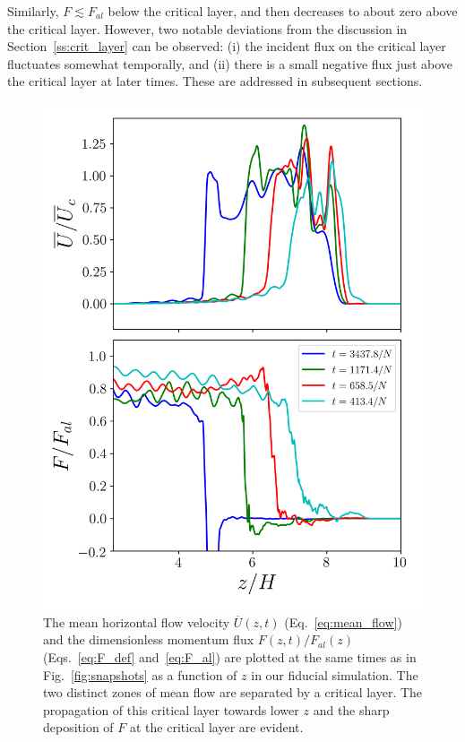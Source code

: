 \documentclass[
        fleqn,
        usenatbib,
        referee,
    ]{mnras}
\begin{document}
Similarly, $F \lesssim F_{al}$ below the critical layer, and then decreases to
about zero above the critical layer. However, two notable deviations from the
discussion in Section~\ref{ss:crit_layer} can be observed: (i) the incident flux
on the critical layer fluctuates somewhat temporally, and (ii) there is a small
negative flux just above the critical layer at later times. These are addressed
in subsequent sections.
\begin{figure}
    \centering
    \includegraphics[width=0.9\columnwidth]{plots/nl_fluxes.png}
    \caption{The mean horizontal flow velocity $\overline{U}(z, t)$
    (Eq.~\eqref{eq:mean_flow}) and the dimensionless momentum flux $F(z, t) /
    F_{al}(z)$ (Eqs.~\eqref{eq:F_def} and~\eqref{eq:F_al}) are plotted at the
    same times as in Fig.~\ref{fig:snapshots} as a function of $z$ in our
    fiducial simulation. The two distinct zones of mean flow are separated by a
    critical layer. The propagation of this critical layer towards lower $z$ and
    the sharp deposition of $F$ at the critical layer are
    evident.}\label{fig:nl_fluxes}
\end{figure}
\end{document}
